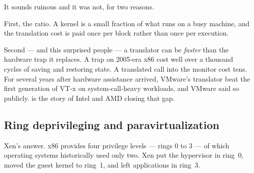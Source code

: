 \begin{conceptbox}
It sounds ruinous and it was not, for two reasons.

\smallskip
First, the ratio. A kernel is a small fraction of what runs on a busy machine,
and the translation cost is paid once per block rather than once per execution.

\smallskip
Second --- and this surprised people --- a translator can be \emph{faster} than
the hardware trap it replaces. A trap on 2005-era x86 cost well over a thousand
cycles of saving and restoring state. A translated call into the monitor cost
tens. For several years after hardware assistance arrived, VMware's translator
beat the first generation of VT-x on system-call-heavy workloads, and VMware
said so publicly.  is the story of Intel and AMD closing that
gap.
\end{conceptbox}

\subsection{Ring deprivileging and paravirtualization}

Xen's answer. x86 provides four privilege levels --- rings 0 to 3 --- of which
operating systems historically used only two. Xen put the hypervisor in ring~0,
moved the guest kernel to ring~1, and left applications in ring~3.

